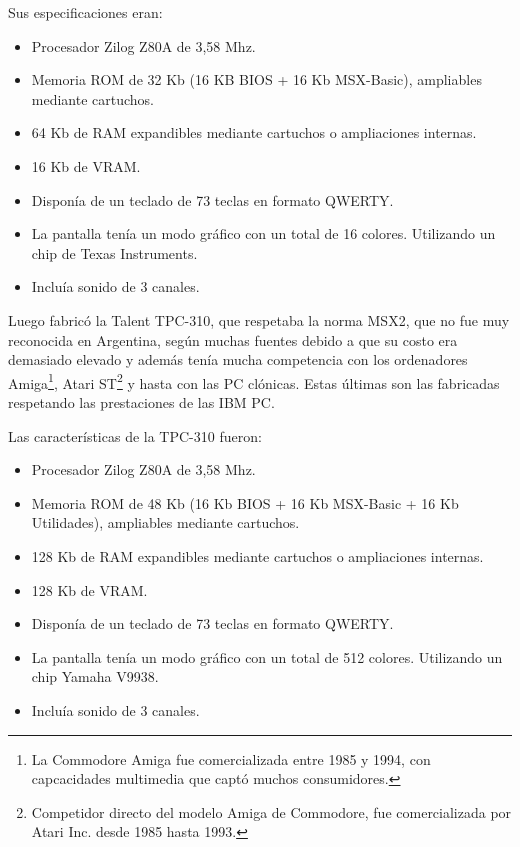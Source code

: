 \documentclass[%
  	final,
%
	notitlepage,
	narroweqnarray,
	inline,
 	twoside,
	]{ieee}
\begin{document}
Sus especificaciones eran:\\

\begin{itemize}
\item Procesador Zilog Z80A de 3,58 Mhz.
\item Memoria ROM de 32 Kb (16 KB BIOS + 16 Kb MSX-Basic), ampliables mediante cartuchos.
\item 64 Kb de RAM expandibles mediante cartuchos o ampliaciones internas.
\item 16 Kb de VRAM.
\item Dispon\'ia de un teclado de 73 teclas en formato QWERTY.
\item La pantalla ten\'ia un modo gr\'afico con un total de 16 colores. Utilizando un chip de Texas Instruments.
\item Inclu\'ia sonido de 3 canales.\\
\end{itemize}

Luego fabric\'o la Talent TPC-310, que respetaba la norma MSX2, que no fue muy reconocida en Argentina, seg\'un muchas fuentes debido a que su costo era demasiado elevado y adem\'as ten\'ia mucha competencia con los ordenadores Amiga\footnote{La Commodore Amiga fue comercializada entre 1985 y 1994, con capcacidades multimedia que capt\'o muchos consumidores\cite{amiga}.}, Atari ST\footnote{Competidor directo del modelo Amiga de Commodore, fue comercializada por Atari Inc. desde 1985 hasta 1993\cite{atari}.} y hasta con las PC cl\'onicas. Estas \'ultimas son las fabricadas respetando las prestaciones de las IBM PC.

Las caracter\'isticas de la TPC-310 fueron:\\

\begin{itemize}
\item Procesador Zilog Z80A de 3,58 Mhz.
\item Memoria ROM de 48 Kb (16 Kb BIOS + 16 Kb MSX-Basic + 16 Kb Utilidades), ampliables mediante cartuchos.
\item 128 Kb de RAM expandibles mediante cartuchos o ampliaciones internas.
\item 128 Kb de VRAM.
\item Dispon\'ia de un teclado de 73 teclas en formato QWERTY.
\item La pantalla ten\'ia un modo gr\'afico con un total de 512 colores. Utilizando un chip Yamaha V9938.
\item Inclu\'ia sonido de 3 canales.
\end{itemize}
\end{document}
